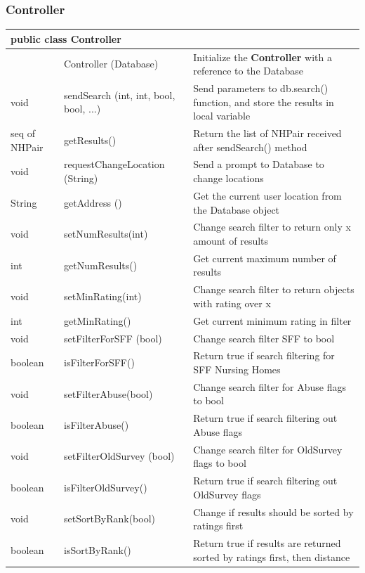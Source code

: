 \documentclass[12pt]{article}
\begin{document}
\newpage
\subsubsection{Controller}
\begin{center}
\begin{tabular}{p{0.1\hsize}|p{0.25\hsize}|p{0.50\hsize}}
\multicolumn{3}{l}{\textbf{public class Controller}} \\
\hline
 & Controller (Database) & Initialize the \textbf{Controller} with a reference to the Database \\
\hline
void  	& sendSearch (int, int, bool, bool, ...) & Send parameters to db.search() function, and store the results in local variable\\
\hline
seq of NHPair  	& getResults() & Return the list of NHPair received after sendSearch() method \\
\hline
void & requestChangeLocation (String) & Send a prompt to Database to change locations \\
\hline
String & getAddress () & Get the current user location from the Database object \\
\hline
void & setNumResults(int) & Change search filter to return only x amount of results\\
\hline
int & getNumResults() & Get current maximum number of results \\
\hline
void & setMinRating(int) & Change search filter to return objects with rating over x\\
\hline
int & getMinRating() & Get current minimum rating in filter\\
\hline
void & setFilterForSFF (bool) & Change search filter SFF to bool\\
\hline
boolean & isFilterForSFF() & Return true if search filtering for SFF Nursing Homes\\
\hline
void & setFilterAbuse(bool) & Change search filter for Abuse flags to bool\\
\hline
boolean & isFilterAbuse() & Return true if search filtering out Abuse flags\\
\hline
void & setFilterOldSurvey (bool) & Change search filter for OldSurvey flags to bool\\
\hline
boolean & isFilterOldSurvey() & Return true if search filtering out OldSurvey flags\\
\hline
void & setSortByRank(bool) & Change if results should be sorted by ratings first\\
\hline
boolean & isSortByRank() & Return true if results are returned sorted by ratings first, then distance\\
\hline
\end{tabular}
\end{center}
\end{document}
